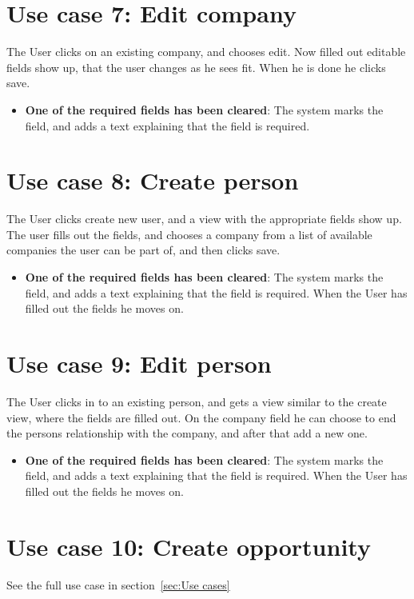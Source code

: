 \section{Use case 7: Edit company }
The User clicks on an existing company, and chooses edit. Now filled out
editable fields show up, that the user changes as he sees fit. When he is done
he clicks save. 
\begin{itemize}
  \item \textbf{One of the required fields has been cleared}: The system marks
    the field, and adds a text explaining that the field is required. 
\end{itemize}

\section{Use case 8: Create person }
The User clicks create new user, and a view with the appropriate fields show up.
The user fills out the fields, and chooses a company from a list of available
companies the user can be part of, and then clicks save. 

\begin{itemize}
  \item \textbf{One of the required fields has been cleared}: The system marks
    the field, and adds a text explaining that the field is required. When the
    User has filled out the fields he moves on. 
\end{itemize}

\section{Use case 9: Edit person }
The User clicks in to an existing person, and gets a view similar to the create
view, where the fields are filled out. On the company field he can choose to end
the persons relationship with the company, and after that add a new one. 

\begin{itemize} 
  \item \textbf{One of the required fields has been cleared}: The system marks
    the field, and adds a text explaining that the field is required. When the
    User has filled out the fields he moves on. 
\end{itemize}

\section{Use case 10: Create opportunity }
See the full use case in section~\ref{sec:Use cases}

